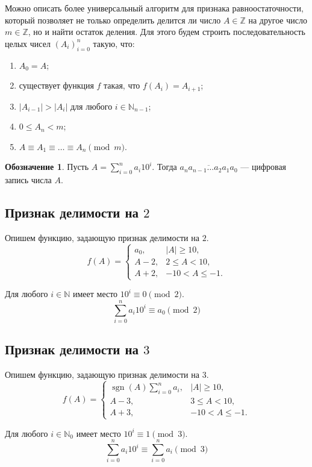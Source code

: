 \documentclass[14pt, a4paper]{extarticle}
\theoremstyle{definition}
\newtheorem*{desig}{Обозначение}
\DeclareMathOperator{\sgn}{sgn}
\begin{document}
	Можно описать более универсальный алгоритм для признака равноостаточности, который позволяет не только определить делится ли число $A\in\mathbb{Z}$ на другое число $m\in\mathbb{Z}$, но и найти остаток деления. Для этого будем строить последовательность целых чисел $(A_i)_{i=0}^n$ такую, что:
	\begin{enumerate}
		\item $A_0=A$;
		\item существует функция $f$ такая, что $f(A_i)=A_{i+1}$;
		\item $|A_{i-1}|>|A_i|$ для любого $i\in\mathbb{N}_{n-1}$;
		\item $0\leqslant A_n<m$;
		\item $A\equiv A_1\equiv\dots\equiv A_n\pmod m$.
	\end{enumerate}

	\begin{desig}
		Пусть $A=\sum_{i=0}^na_i10^i$. Тогда $\overline{a_na_{n-1}\dots a_2a_1a_0}$ --- цифровая запись числа $A$.
	\end{desig}

\subsection{Признак делимости на $2$}

	Опишем функцию, задающую признак делимости на $2$.
	$$f(A)=\begin{cases}
		a_0,&|A|\geqslant10,\\
		A-2,&2\leqslant A<10,\\
		A+2,&-10<A\leqslant-1.
	\end{cases}$$

	Для любого $i\in\mathbb{N}$ имеет место $10^i\equiv0\pmod2$.
	$$\sum_{i=0}^na_i10^i\equiv a_0\pmod2$$

\subsection{Признак делимости на $3$}

	Опишем функцию, задающую признак делимости на $3$.
	$$f(A)=\begin{cases}
		\sgn(A)\sum_{i=0}^na_i,&|A|\geqslant10,\\
		A-3,&3\leqslant A<10,\\
		A+3,&-10<A\leqslant-1.
	\end{cases}$$

	Для любого $i\in\mathbb{N}_0$ имеет место $10^i\equiv1\pmod3$.
	$$\sum_{i=0}^na_i10^i\equiv\sum_{i=0}^na_i\pmod3$$
\end{document}
